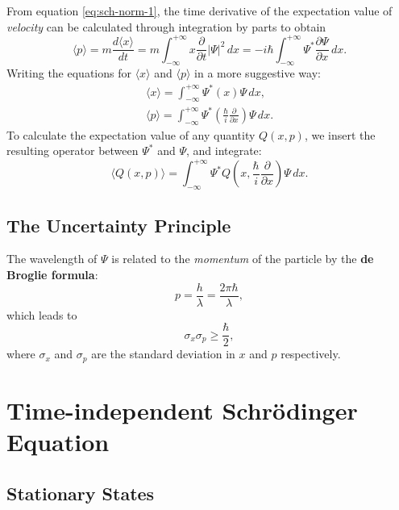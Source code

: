 \documentclass{article}
\begin{document}
From equation \eqref{eq:sch-norm-1}, the time derivative of the expectation
value of \emph{velocity} can be calculated through integration by parts to
obtain \[
  \langle p \rangle
  = m\frac{d\langle x \rangle}{dt}
  = m\int_{-\infty}^{+\infty} x \frac{\partial}{\partial t} |\Psi|^2 \,dx
  = -i\hbar\int_{-\infty}^{+\infty} \Psi^*
  \frac{\partial \Psi}{\partial x} \,dx.
\] Writing the equations for $\langle x \rangle$ and $\langle p \rangle$ in a
more suggestive way:
\begin{gather}
  \label{eq:sch-vel}
  \langle x \rangle = \int_{-\infty}^{+\infty} \Psi^* (x) \Psi \,dx, \\
  \label{eq:sch-mom}
  \langle p \rangle
  = \int_{-\infty}^{+\infty} \Psi^*\left(
    \frac{\hbar}{i} \frac{\partial}{\partial x}
  \right)\Psi \,dx.
\end{gather}
To calculate the expectation value of any quantity $Q(x, p)$, we insert the
resulting operator between $\Psi^*$ and $\Psi$, and integrate:
\begin{equation} \label{eq:sch-qty}
  \boxed{
    \langle Q(x, p) \rangle = \int_{-\infty}^{+\infty} \Psi^* Q\left(
      x, \frac{\hbar}{i}\frac{\partial}{\partial x}
    \right)\Psi \,dx.
  }
\end{equation}

\subsection{The Uncertainty Principle}

The wavelength of $\Psi$ is related to the \emph{momentum} of the particle by
the \textbf{de Broglie formula}:
\begin{equation} \label{eq:de-brog}
  p = \frac{h}{\lambda} = \frac{2\pi\hbar}{\lambda},
\end{equation}
which leads to
\begin{equation} \label{eq:unc-prin}
  \boxed{
    \sigma_x \sigma_p \geq \frac{\hbar}{2},
  }
\end{equation}
where $\sigma_x$ and $\sigma_p$ are the standard deviation in $x$ and $p$
respectively.

\section{Time-independent Schr\"{o}dinger Equation}

\subsection{Stationary States}
\end{document}
